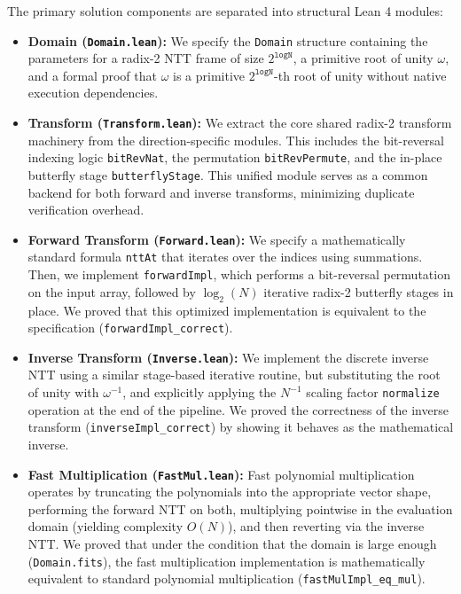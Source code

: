 \documentclass[a4paper,12pt]{report}
\begin{document}
The primary solution components are separated into structural Lean 4 modules:
\begin{itemize}
    \item \textbf{Domain (\texttt{Domain.lean}):} We specify the \texttt{Domain} structure containing the parameters for a radix-2 NTT frame of size $2^{\texttt{logN}}$, a primitive root of unity $\omega$, and a formal proof that $\omega$ is a primitive $2^{\texttt{logN}}$-th root of unity without native execution dependencies.
    \item \textbf{Transform (\texttt{Transform.lean}):} We extract the core shared radix-2 transform machinery from the direction-specific modules. This includes the bit-reversal indexing logic \texttt{bitRevNat}, the permutation \texttt{bitRev}\allowbreak\texttt{Permute}, and the in-place butterfly stage \texttt{butterfly}\allowbreak\texttt{Stage}. This unified module serves as a common backend for both forward and inverse transforms, minimizing duplicate verification overhead.
    \item \textbf{Forward Transform (\texttt{Forward.lean}):} We specify a mathematically standard formula \texttt{nttAt} that iterates over the indices using summations. Then, we implement \texttt{forward}\allowbreak\texttt{Impl}, which performs a bit-reversal permutation on the input array, followed by $\log_2(N)$ iterative radix-2 butterfly stages in place. We proved that this optimized implementation is equivalent to the specification (\texttt{forward}\allowbreak\texttt{Impl\_}\allowbreak\texttt{correct}).
    \item \textbf{Inverse Transform (\texttt{Inverse.lean}):} We implement the discrete inverse NTT using a similar stage-based iterative routine, but substituting the root of unity with $\omega^{-1}$, and explicitly applying the $N^{-1}$ scaling factor \texttt{normalize} operation at the end of the pipeline. We proved the correctness of the inverse transform (\texttt{inverse}\allowbreak\texttt{Impl\_}\allowbreak\texttt{correct}) by showing it behaves as the mathematical inverse.
    \item \textbf{Fast Multiplication (\texttt{FastMul.lean}):} Fast polynomial multiplication operates by truncating the polynomials into the appropriate vector shape, performing the forward NTT on both, multiplying pointwise in the evaluation domain (yielding complexity $O(N)$), and then reverting via the inverse NTT. We proved that under the condition that the domain is large enough (\texttt{Domain.fits}), the fast multiplication implementation is mathematically equivalent to standard polynomial multiplication (\texttt{fastMul}\allowbreak\texttt{Impl\_}\allowbreak\texttt{eq\_}\allowbreak\texttt{mul}).
\end{itemize}
\end{document}
